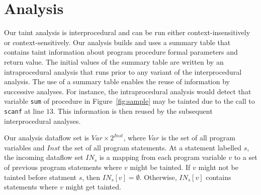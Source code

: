 \section{Analysis}\label{stagedAnalysis}

\newcommand{\Aset}{\mathcal{A}}
\newcommand{\Pset}{\mathcal{P}}
\newcommand{\varset}{\mathit{Var}}
\newcommand{\instset}{\mathit{Inst}}
\newcommand{\procset}{\mathit{Proc}}
\newcommand{\formalsset}{\mathit{formals}}
\newcommand{\firstfunc}{\mathit{first}}
\newcommand{\toplevelfunc}{\mathit{toplevel}}
\newcommand{\pointsto}[2]{{pt}_{[#1]}(#2)}
\newcommand{\pointstobefore}[2]{{pt}_{[\overline{#1}]	}(#2)}
\newcommand{\pointstoafter}[2]{{pt}_{[\underline{#1}]}(#2)}

\newcommand{\myinflow}{\mathit{IN}}
\newcommand{\ifff}{\mathit{iff}}
\newcommand{\aand}{\mathit{and}}
\newcommand{\mybigcup}[2]{\mathlarger{\bigcup_{#1}^{#2}}}

\newcommand{\copydef}{$\text{COPY}\ [p = q]$}
\newcommand{\loaddef}{$\text{LOAD}\ [p = *q]$}
\newcommand{\addrofdef}{$\text{ADDROF}\ [p = \&a]$}
\newcommand{\storedef}{$\text{STORE}\ [*p = q]$}
\newcommand{\sourcedef}{$\text{SOURCE}\ [r = \text{call}\ \text{func}(a_0, a_1, ..., a_n)]$}
\newcommand{\calldef}{$\text{SINK} [r = \text{call}\ \text{func}]$}
\newcommand{\sinkdef}{\calldef}

Our taint analysis is interprocedural and can be run
either context-insensitively or context-sensitively.
Our analysis builds and uses a summary table that contains
taint information about program procedure formal parameters
and return value.
The initial values of the summary table are written by
an intraprocedural analysis that runs prior to any variant
of the interprocedural analysis. The use of a summary table
enables the reuse of information by successive analyses.
For instance, the intraprocedural analysis would
detect that variable \texttt{sum} of procedure \compute{} in
Figure~\ref{fig:sample} may be tainted due to the call
to \texttt{scanf} at line $13$. This information is then
reused by the subsequent interprocedural analyses.

Our analysis dataflow set is $\varset \times 2^\instset$,
where $\varset$ is the set of all program variables and
$\instset$ the set of all program statements. 
At a statement labelled $s$, the incoming dataflow set $\myinflow_s$
is a mapping from each program variable $v$ to a set of
previous program statements where $v$ might be tainted.
If $v$ might not be tainted before statment $s$, then
$\myinflow_s[v] = \emptyset$. Otherwise, $\myinflow_s[v]$
contains statements where $v$ might get tainted.

